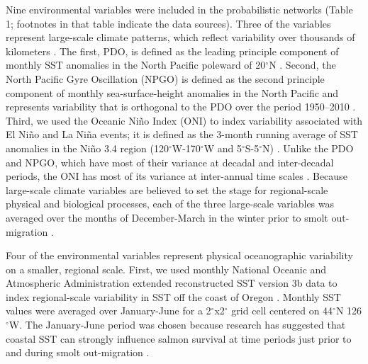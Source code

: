 Nine environmental variables were included in the probabilistic networks (Table
1; footnotes in that table indicate the data sources). Three of the variables
represent large-scale climate patterns, which reflect variability over thousands
of kilometers \citep{King2011}. The first, PDO, is defined as the leading
principle component of monthly SST anomalies in the North Pacific poleward of
20$^{\circ}$N \citep{Mantua1997a}.  Second, the North Pacific Gyre Oscillation (NPGO) is
defined as the second principle component of monthly sea-surface-height
anomalies in the North Pacific and represents variability that is orthogonal to
the PDO over the period 1950--2010 \citep{Di-Lorenzo2008a}. Third, we used the
Oceanic Ni\~{n}o Index (ONI) to index variability associated with El Ni\~{n}o and La
Ni\~{n}a events; it is defined as the 3-month running average of SST anomalies in
the Ni\~{n}o 3.4 region (120$^{\circ}$W-170$^{\circ}$W and 5$^{\circ}$S-5$^{\circ}$N) \citep{Trenberth1997}. Unlike the
PDO and NPGO, which have most of their variance at decadal and inter-decadal
periods, the ONI has most of its variance at inter-annual time scales
\citep{Sarachik2010a}. Because large-scale climate variables are believed to set
the stage for regional-scale physical and biological processes, each of the
three large-scale variables was averaged over the months of December-March in
the winter prior to smolt out-migration \citep{Mantua1997a, Yeh2011,
DiLorenzo2013a}.

Four of the environmental variables represent physical oceanographic variability
on a smaller, regional scale. First, we used monthly National Oceanic and
Atmospheric Administration extended reconstructed SST version 3b data to index
regional-scale variability in SST off the coast of Oregon \citep{Smith2008a}.
Monthly SST values were averaged over January-June for a 2$^{\circ}$x2$^{\circ}$ grid cell
centered on 44$^{\circ}$N 126$^{\circ}$W. The January-June period was chosen because research has
suggested that coastal SST can strongly influence salmon survival at time
periods just prior to and during smolt out-migration \citep{Mueter2005a}.

